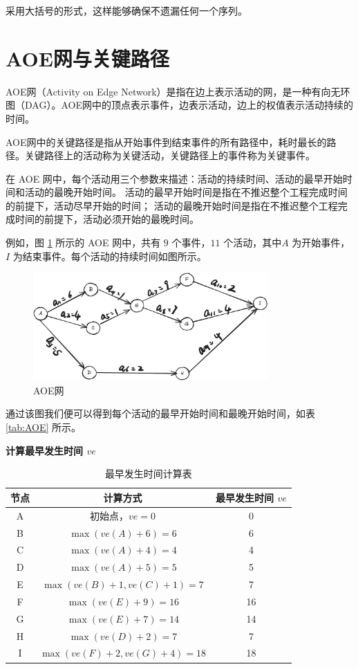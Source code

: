 \documentclass[lang=cn,newtx,10pt,scheme=chinese]{elegantbook}
\begin{document}
采用大括号的形式，这样能够确保不遗漏任何一个序列。
\section{AOE网与关键路径}

AOE网（Activity on Edge Network）是指在边上表示活动的网，是一种有向无环图（DAG）。AOE网中的顶点表示事件，边表示活动，边上的权值表示活动持续的时间。

AOE网中的关键路径是指从开始事件到结束事件的所有路径中，耗时最长的路径。关键路径上的活动称为关键活动，关键路径上的事件称为关键事件。

在 AOE 网中，每个活动用三个参数来描述：活动的持续时间、活动的最早开始时间和活动的最晚开始时间。
活动的最早开始时间是指在不推迟整个工程完成时间的前提下，活动尽早开始的时间；
活动的最晚开始时间是指在不推迟整个工程完成时间的前提下，活动必须开始的最晚时间。

例如，图 \ref{fig:AOE} 所示的 AOE 网中，共有 $9$ 个事件，$11$ 个活动，其中$A$ 为开始事件，$I$ 为结束事件。每个活动的持续时间如图所示。

\begin{figure}[h!]
  \centering
  \includegraphics[width=0.8\textwidth]{./figure/pdf/cropped/AOE.pdf}
  \caption{AOE网}
  \label{fig:AOE}
\end{figure}

通过该图我们便可以得到每个活动的最早开始时间和最晚开始时间，如表 \ref{tab:AOE} 所示。

\textbf{计算最早发生时间 $ve$}
\begin{table}[h]
    \centering
    \begin{tabular}{c|c|c}
        \toprule
        \textbf{节点} & \textbf{计算方式} & \textbf{最早发生时间 $ve$} \\
        \midrule
        A & 初始点，$ve=0$ & 0 \\
        B & $\max(ve(A) + 6) = 6$ & 6 \\
        C & $\max(ve(A) + 4) = 4$ & 4 \\
        D & $\max(ve(A) + 5) = 5$ & 5 \\
        E & $\max(ve(B) + 1, ve(C) + 1) = 7$ & 7 \\
        F & $\max(ve(E) + 9) = 16$ & 16 \\
        G & $\max(ve(E) + 7) = 14$ & 14 \\
        H & $\max(ve(D) + 2) = 7$ & 7 \\
        I & $\max(ve(F) + 2, ve(G) + 4) = 18$ & 18 \\
        \bottomrule
    \end{tabular}
    \caption{最早发生时间计算表}
\end{table}
\end{document}
